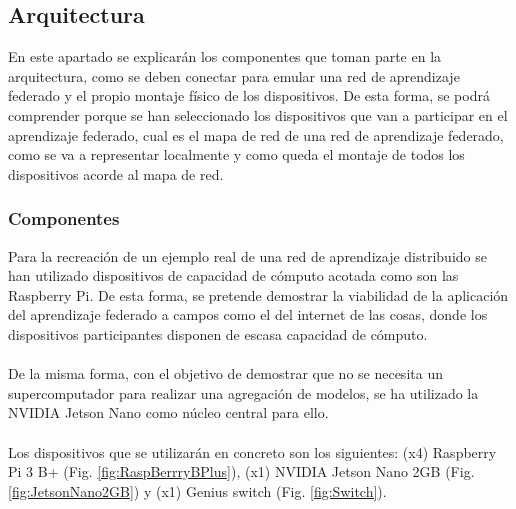 \subsection{Arquitectura}
En este apartado se explicarán los componentes que toman parte en la arquitectura, como se deben conectar para emular una red de aprendizaje federado y el propio montaje físico de los dispositivos. De esta forma, se podrá comprender porque se han seleccionado los dispositivos que van a participar en el aprendizaje federado, cual es el mapa de red de una red de aprendizaje federado, como se va a representar localmente y como queda el montaje de todos los dispositivos acorde al mapa de red.  

\subsubsection{Componentes}
Para la recreación de un ejemplo real de una red de aprendizaje distribuido se han utilizado dispositivos de capacidad de cómputo acotada como son las Raspberry Pi. De esta forma, se pretende demostrar la viabilidad de la aplicación del aprendizaje federado a campos como el del internet de las cosas, donde los dispositivos participantes disponen de escasa capacidad de cómputo.
\\ \\
De la misma forma, con el objetivo de demostrar que no se necesita un supercomputador para realizar una agregación de modelos, se ha utilizado la NVIDIA Jetson Nano como núcleo central para ello.
\\ \\
Los dispositivos que se utilizarán en concreto son los siguientes: (x4) Raspberry Pi 3 B+ (Fig. \ref{fig:RaspBerrryBPlus}), (x1) NVIDIA Jetson Nano 2GB (Fig. \ref{fig:JetsonNano2GB}) y (x1) Genius switch (Fig. \ref{fig:Switch}).

